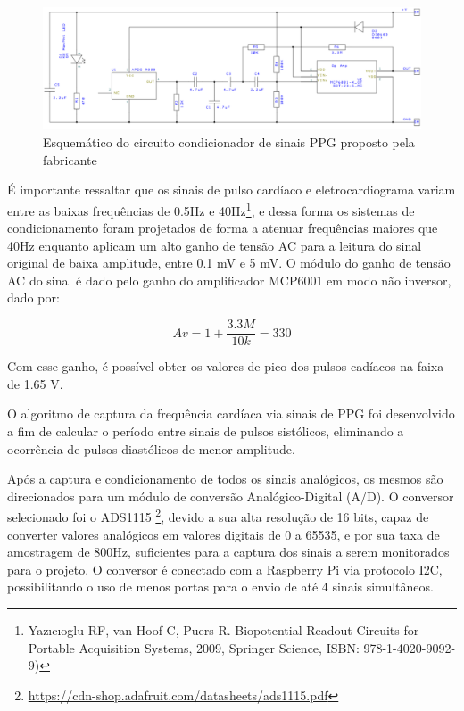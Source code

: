 \begin{figure}[h!]
    \begin{center}
        \includegraphics[scale=0.4]{figuras/ecg_sch.png}
    \end{center}
    \caption{Esquemático do circuito condicionador de sinais PPG proposto pela fabricante}
    \label{fig:ecg_sch}
\end{figure}

É importante ressaltar que os sinais de pulso cardíaco e eletrocardiograma variam 
entre as baixas frequências de 0.5Hz e 40Hz\footnote{ Yazıcıoglu RF, van Hoof C,
Puers R. Biopotential Readout Circuits for Portable Acquisition Systems, 2009,
Springer Science, ISBN: 978-1-4020-9092-9)}, e dessa forma os sistemas de 
condicionamento foram projetados de forma a atenuar frequências maiores que 40Hz 
enquanto aplicam um alto ganho de tensão AC para a leitura do sinal original de 
baixa amplitude, entre 0.1 mV e 5 mV. O módulo do ganho de tensão AC do sinal é dado pelo ganho do 
amplificador MCP6001 em modo não inversor, dado por:

\begin{equation}
  Av = 1 + \frac{3.3M}{10k} = 330
\end{equation}

Com esse ganho, é possível obter os valores de pico dos pulsos cadíacos na faixa 
de 1.65 V.

O algoritmo de captura da frequência cardíaca via sinais de PPG foi desenvolvido 
a fim de calcular o período entre sinais de pulsos sistólicos, eliminando a 
ocorrência de pulsos diastólicos de menor amplitude.

Após a captura e condicionamento de todos os sinais analógicos, os mesmos são direcionados
para um módulo de conversão Analógico-Digital (A/D). O conversor selecionado foi o ADS1115 \footnote{\url{https://cdn-shop.adafruit.com/datasheets/ads1115.pdf}},
devido a sua alta resolução de 16 bits, capaz de converter valores analógicos em valores
digitais de 0 a 65535, e por sua taxa de amostragem de 800Hz, suficientes para a captura dos
sinais a serem monitorados para o projeto. O conversor é conectado com a Raspberry Pi via protocolo I2C,
possibilitando o uso de menos portas para o envio de até 4 sinais simultâneos.


